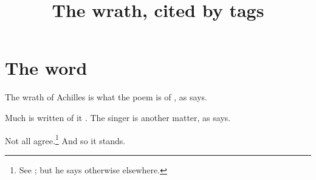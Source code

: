 \documentclass{article}
\title{The wrath, cited by tags}
\begin{document}
\maketitle

\section{The word}

The wrath of Achilles is what the poem is of \cite[73]{nagy1979}, as \textcite[chap. 3]{west1988} says.

Much is written of it \parencite[see][chap. 2]{nagy1979,lord1960}.
The singer \cite[12]{lord1960} is another matter, as \citeauthor{lord1960} says.

Not all agree.\footnote{See \cite[73]{nagy1979,parry1971}; but he says otherwise elsewhere.} And so it stands.
\end{document}
